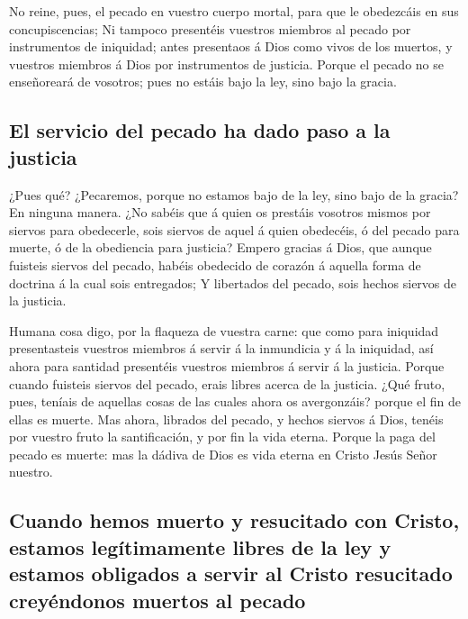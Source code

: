  No reine, pues, el pecado en vuestro cuerpo mortal, para
que le obedezcáis en sus concupiscencias;  Ni tampoco
presentéis vuestros miembros al pecado por instrumentos de iniquidad;
antes presentaos á Dios como vivos de los muertos, y vuestros miembros á
Dios por instrumentos de justicia.  Porque el pecado no
se enseñoreará de vosotros; pues no estáis bajo la ley, sino bajo la
gracia.

\hypertarget{el-servicio-del-pecado-ha-dado-paso-a-la-justicia}{%
\subsection{El servicio del pecado ha dado paso a la
justicia}\label{el-servicio-del-pecado-ha-dado-paso-a-la-justicia}}

 ¿Pues qué? ¿Pecaremos, porque no estamos bajo de la ley,
sino bajo de la gracia? En ninguna manera.  ¿No sabéis
que á quien os prestáis vosotros mismos por siervos para obedecerle,
sois siervos de aquel á quien obedecéis, ó del pecado para muerte, ó de
la obediencia para justicia?  Empero gracias á Dios, que
aunque fuisteis siervos del pecado, habéis obedecido de corazón á
aquella forma de doctrina á la cual sois entregados;  Y
libertados del pecado, sois hechos siervos de la justicia.

 Humana cosa digo, por la flaqueza de vuestra carne: que
como para iniquidad presentasteis vuestros miembros á servir á la
inmundicia y á la iniquidad, así ahora para santidad presentéis vuestros
miembros á servir á la justicia.  Porque cuando fuisteis
siervos del pecado, erais libres acerca de la justicia. 
¿Qué fruto, pues, teníais de aquellas cosas de las cuales ahora os
avergonzáis? porque el fin de ellas es muerte.  Mas
ahora, librados del pecado, y hechos siervos á Dios, tenéis por vuestro
fruto la santificación, y por fin la vida eterna.  Porque
la paga del pecado es muerte: mas la dádiva de Dios es vida eterna en
Cristo Jesús Señor nuestro.

\hypertarget{cuando-hemos-muerto-y-resucitado-con-cristo-estamos-leguxedtimamente-libres-de-la-ley-y-estamos-obligados-a-servir-al-cristo-resucitado-creyuxe9ndonos-muertos-al-pecado}{%
\subsection{Cuando hemos muerto y resucitado con Cristo, estamos
legítimamente libres de la ley y estamos obligados a servir al Cristo
resucitado creyéndonos muertos al
pecado}\label{cuando-hemos-muerto-y-resucitado-con-cristo-estamos-leguxedtimamente-libres-de-la-ley-y-estamos-obligados-a-servir-al-cristo-resucitado-creyuxe9ndonos-muertos-al-pecado}}

